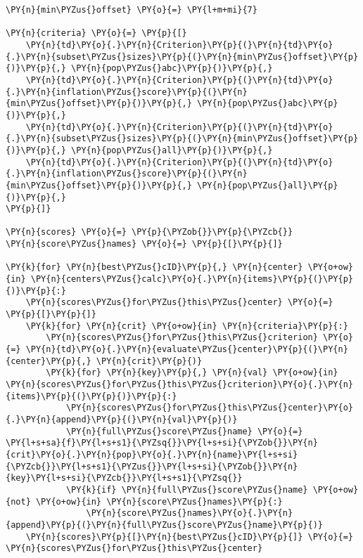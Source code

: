     \begin{tcolorbox}[breakable, size=fbox, boxrule=1pt, pad at break*=1mm,colback=cellbackground, colframe=cellborder]
\begin{Verbatim}[commandchars=\\\{\}]
\PY{n}{min\PYZus{}offset} \PY{o}{=} \PY{l+m+mi}{7}

\PY{n}{criteria} \PY{o}{=} \PY{p}{[}
    \PY{n}{td}\PY{o}{.}\PY{n}{Criterion}\PY{p}{(}\PY{n}{td}\PY{o}{.}\PY{n}{subset\PYZus{}sizes}\PY{p}{(}\PY{n}{min\PYZus{}offset}\PY{p}{)}\PY{p}{,} \PY{n}{pop\PYZus{}abc}\PY{p}{)}\PY{p}{,}
    \PY{n}{td}\PY{o}{.}\PY{n}{Criterion}\PY{p}{(}\PY{n}{td}\PY{o}{.}\PY{n}{inflation\PYZus{}score}\PY{p}{(}\PY{n}{min\PYZus{}offset}\PY{p}{)}\PY{p}{,} \PY{n}{pop\PYZus{}abc}\PY{p}{)}\PY{p}{,}
    \PY{n}{td}\PY{o}{.}\PY{n}{Criterion}\PY{p}{(}\PY{n}{td}\PY{o}{.}\PY{n}{subset\PYZus{}sizes}\PY{p}{(}\PY{n}{min\PYZus{}offset}\PY{p}{)}\PY{p}{,} \PY{n}{pop\PYZus{}all}\PY{p}{)}\PY{p}{,}
    \PY{n}{td}\PY{o}{.}\PY{n}{Criterion}\PY{p}{(}\PY{n}{td}\PY{o}{.}\PY{n}{inflation\PYZus{}score}\PY{p}{(}\PY{n}{min\PYZus{}offset}\PY{p}{)}\PY{p}{,} \PY{n}{pop\PYZus{}all}\PY{p}{)}\PY{p}{,}
\PY{p}{]}

\PY{n}{scores} \PY{o}{=} \PY{p}{\PYZob{}}\PY{p}{\PYZcb{}}
\PY{n}{score\PYZus{}names} \PY{o}{=} \PY{p}{[}\PY{p}{]}

\PY{k}{for} \PY{n}{best\PYZus{}cID}\PY{p}{,} \PY{n}{center} \PY{o+ow}{in} \PY{n}{centers\PYZus{}calc}\PY{o}{.}\PY{n}{items}\PY{p}{(}\PY{p}{)}\PY{p}{:}
    \PY{n}{scores\PYZus{}for\PYZus{}this\PYZus{}center} \PY{o}{=} \PY{p}{[}\PY{p}{]}
    \PY{k}{for} \PY{n}{crit} \PY{o+ow}{in} \PY{n}{criteria}\PY{p}{:}
        \PY{n}{scores\PYZus{}for\PYZus{}this\PYZus{}criterion} \PY{o}{=} \PY{n}{td}\PY{o}{.}\PY{n}{evaluate\PYZus{}center}\PY{p}{(}\PY{n}{center}\PY{p}{,} \PY{n}{crit}\PY{p}{)}
        \PY{k}{for} \PY{n}{key}\PY{p}{,} \PY{n}{val} \PY{o+ow}{in} \PY{n}{scores\PYZus{}for\PYZus{}this\PYZus{}criterion}\PY{o}{.}\PY{n}{items}\PY{p}{(}\PY{p}{)}\PY{p}{:}
            \PY{n}{scores\PYZus{}for\PYZus{}this\PYZus{}center}\PY{o}{.}\PY{n}{append}\PY{p}{(}\PY{n}{val}\PY{p}{)}
            \PY{n}{full\PYZus{}score\PYZus{}name} \PY{o}{=} \PY{l+s+sa}{f}\PY{l+s+s1}{\PYZsq{}}\PY{l+s+si}{\PYZob{}}\PY{n}{crit}\PY{o}{.}\PY{n}{pop}\PY{o}{.}\PY{n}{name}\PY{l+s+si}{\PYZcb{}}\PY{l+s+s1}{\PYZus{}}\PY{l+s+si}{\PYZob{}}\PY{n}{key}\PY{l+s+si}{\PYZcb{}}\PY{l+s+s1}{\PYZsq{}}
            \PY{k}{if} \PY{n}{full\PYZus{}score\PYZus{}name} \PY{o+ow}{not} \PY{o+ow}{in} \PY{n}{score\PYZus{}names}\PY{p}{:}
                \PY{n}{score\PYZus{}names}\PY{o}{.}\PY{n}{append}\PY{p}{(}\PY{n}{full\PYZus{}score\PYZus{}name}\PY{p}{)}
    \PY{n}{scores}\PY{p}{[}\PY{n}{best\PYZus{}cID}\PY{p}{]} \PY{o}{=} \PY{n}{scores\PYZus{}for\PYZus{}this\PYZus{}center}


\end{Verbatim}
\end{tcolorbox}
